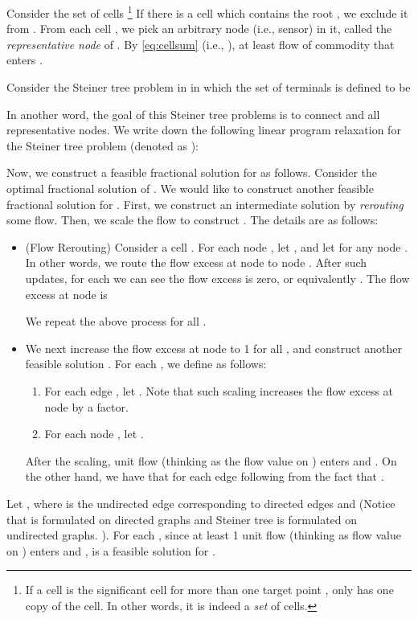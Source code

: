 \documentclass[11pt]{article}
\begin{document}
Consider the set of cells 
\footnote{
	If a cell is the significant cell for more than one target point ,
	 only has one copy of the cell. In other words,
	it is indeed a {\em set} of cells.
}
If there is a cell which contains the root , we exclude it from .
From each cell , we pick an arbitrary node (i.e., sensor)  in it, 
called the {\em representative node} of .
By \ref{eq:cellsum} (i.e., ), at least  
flow of commodity  that enters .

Consider the Steiner tree problem in  
in which the set of terminals is defined to be

In another word, the goal of this Steiner tree problems
is to connect  and all representative nodes.
We write down the following linear program relaxation for the
Steiner tree problem (denoted as ):


Now, we construct a feasible fractional solution for 
as follows.
Consider the optimal fractional solution  of .
We would like to construct another feasible fractional solution  for .
First, we construct an intermediate solution  by
{\em rerouting} some flow. 
Then, we scale the flow to construct .
The details are as follows:

\begin{itemize}
	\item (Flow Rerouting)
	Consider a cell .
	For each node , let , and let  for any node . In other words, we route
	the flow excess at node  to node .
	After such updates, for each  we can see the flow excess is zero, or
	equivalently .
	The flow excess at node  is
	
	We repeat the above process for all .
	\item
	We next increase the flow excess at node  to 1 for all , and construct another feasible solution . For each , we define  as follows: 
	\begin{enumerate}
		\item For each edge , let .
		Note that such scaling increases the flow excess at node  by a  factor. 
		\item For each node , let . 
	\end{enumerate}
	After the scaling,  unit flow (thinking  as the flow value on ) enters  and . On the other hand, we have that  for each edge  following from the fact that . \end{itemize}


Let , where  is the undirected edge corresponding to directed edges  and  (Notice that  is formulated on directed graphs and Steiner tree is formulated on undirected graphs.
).
For each , since at least 1 unit flow (thinking  as flow value on ) enters  and ,  is a feasible solution for 
.
\end{document}
